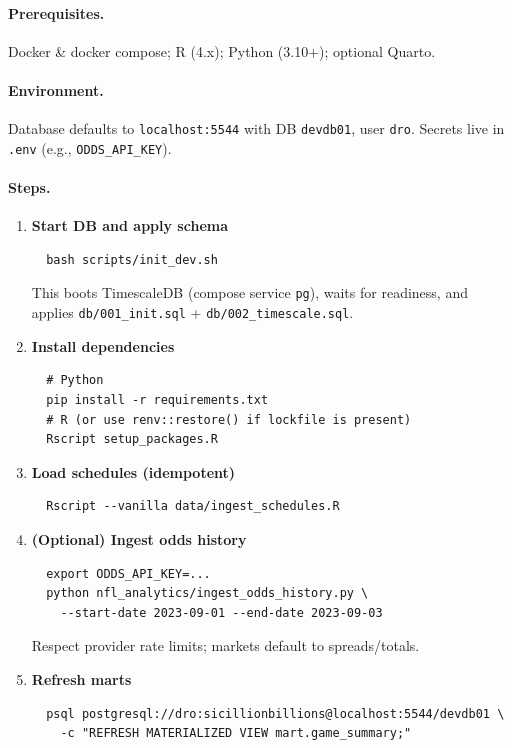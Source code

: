 \paragraph{Prerequisites.} Docker \& docker compose; R (4.x); Python (3.10+); optional Quarto.
\paragraph{Environment.} Database defaults to \texttt{localhost:5544} with DB \texttt{devdb01}, user \texttt{dro}. Secrets live in \texttt{.env} (e.g., \texttt{ODDS\_API\_KEY}).
\paragraph{Steps.}
\begin{enumerate}
  \item \textbf{Start DB and apply schema}
  \begin{verbatim}
  bash scripts/init_dev.sh
  \end{verbatim}
  This boots TimescaleDB (compose service \texttt{pg}), waits for readiness, and applies \texttt{db/001\_init.sql} + \texttt{db/002\_timescale.sql}.

  \item \textbf{Install dependencies}
  \begin{verbatim}
  # Python
  pip install -r requirements.txt
  # R (or use renv::restore() if lockfile is present)
  Rscript setup_packages.R
  \end{verbatim}

  \item \textbf{Load schedules (idempotent)}
  \begin{verbatim}
  Rscript --vanilla data/ingest_schedules.R
  \end{verbatim}

  \item \textbf{(Optional) Ingest odds history}
  \begin{verbatim}
  export ODDS_API_KEY=...
  python nfl_analytics/ingest_odds_history.py \
    --start-date 2023-09-01 --end-date 2023-09-03
  \end{verbatim}
  Respect provider rate limits; markets default to spreads/totals.

  \item \textbf{Refresh marts}
  \begin{verbatim}
  psql postgresql://dro:sicillionbillions@localhost:5544/devdb01 \
    -c "REFRESH MATERIALIZED VIEW mart.game_summary;"
  \end{verbatim}


\end{enumerate}

